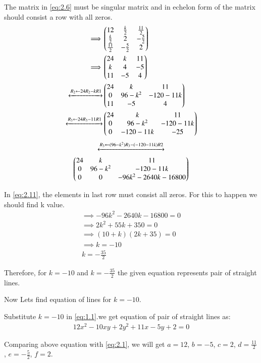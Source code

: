 \documentclass[journal,12pt,twocolumn]{IEEEtran}
\begin{document}
The matrix in \eqref{eq:2.6} must be singular matrix and in echelon form of the matrix should consist a row with all zeros.
\begin{align}
    \implies&\begin{pmatrix}12 & \frac{k}{2} & \frac{11}{2} \\ \frac{k}{2} & 2 & -\frac{5}{2} \\ \frac{11}{2} & -\frac{5}{2} & 2\end{pmatrix}\\
    \implies&\begin{pmatrix}24 & k & 11 \\ k & 4 & -5 \\ 11 & -5 & 4\end{pmatrix}\\
    \xleftrightarrow[]{R_2\leftarrow 24R_2-kR1}&\begin{pmatrix}24 & k & 11 \\ 0 & 96-k^2 & -120-11k \\ 11 & -5 & 4\end{pmatrix}\\
    \xleftrightarrow[]{R_3\leftarrow 24R_3-11R1}&\begin{pmatrix}24 & k & 11 \\ 0 & 96-k^2 & -120-11k \\ 0 & -120-11k & -25\end{pmatrix}
\end{align}
\begin{multline}
    \xleftrightarrow[]{R_3\leftarrow (96-k^2)R_3-(-120-11k)R2}\\\begin{pmatrix}24 & k & 11 \\ 0 & 96-k^2 & -120-11k \\ 0 & 0 & -96k^2-2640k-16800\end{pmatrix}\label{eq:2.11}
\end{multline}

In \eqref{eq:2.11}, the elements in last row must consist all zeros. For this to happen we should find k value.
\begin{align}
    \implies-96k^2-2640k-16800=0\\
    \implies2k^2+55k+350=0\\
    \implies(10+k)(2k+35)=0\\
    \implies k=-10\nonumber\\k=-\frac{35}{2}
\end{align}

Therefore, for $k=-10$ and $k=-\frac{35}{2}$ the given equation represents pair of straight lines.

Now Lets find equation of lines for $k=-10$.

Substitute $k=-10$ in \eqref{eq:1.1}.we get equation of pair of straight lines as:
\begin{align}
    12x^2-10xy+2y^2+11x-5y+2=0
\end{align}

Comparing above equation with \eqref{eq:2.1}, we will get $a=12$, $b=-5$, $c=2$, $d=\frac{11}{2}$, $e=-\frac{5}{2}$, $f=2$.
\end{document}
